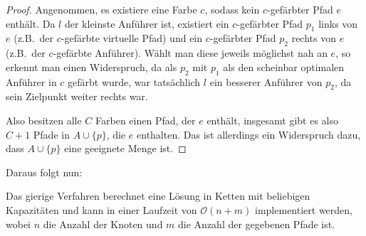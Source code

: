 \begin{proof}
    Angenommen, es existiere eine Farbe $c$, sodass kein $c$-gefärbter Pfad $e$ enthält.
    Da $l$ der kleinste Anführer ist, existiert ein $c$-gefärbter Pfad $p_1$ links von $e$ (z.B.\ der $c$-gefärbte virtuelle Pfad) und ein $c$-gefärbter Pfad $p_2$
    rechts von $e$ (z.B.\ der $c$-gefärbte Anführer).
    Wählt man diese jeweils möglichst nah an $e$, so erkennt man einen Widerspruch, da als $p_2$ mit $p_1$ als den
    scheinbar optimalen Anführer in $c$ gefärbt wurde, war tatsächlich $l$ ein besserer Anführer von $p_2$, da sein Zielpunkt weiter rechts war.

    Also besitzen alle $C$ Farben einen Pfad, der $e$ enthält, insgesamt gibt es also $C+1$ Pfade in $A \cup \{p\}$, die
    $e$ enthalten.
    Das ist allerdings ein Widerspruch dazu, dass $A \cup \{p\}$ eine geeignete Menge ist.
\end{proof}

Daraus folgt nun:

\begin{theorem}
    Das gierige Verfahren berechnet eine Lösung in Ketten mit beliebigen Kapazitäten und kann in einer Laufzeit von
    $\mathcal O(n+m)$ implementiert werden, wobei $n$ die Anzahl der Knoten und $m$ die Anzahl der gegebenen Pfade ist.
\end{theorem}











